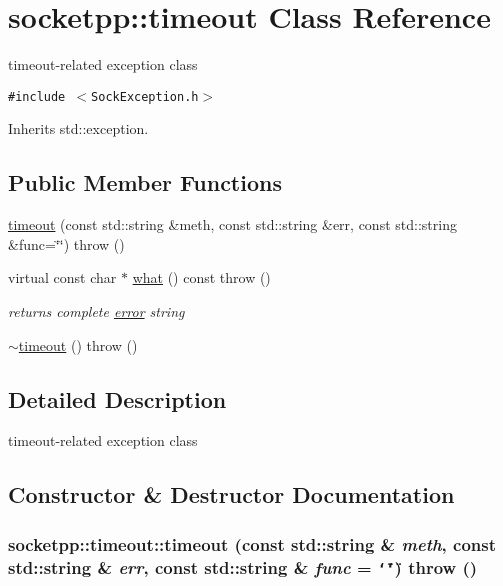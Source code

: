 \hypertarget{classsocketpp_1_1timeout}{
\section{socketpp::timeout Class Reference}
\label{classsocketpp_1_1timeout}
}
timeout-related exception class  


{\tt \#include $<$SockException.h$>$}

Inherits std::exception.

\subsection*{Public Member Functions}
\begin{CompactItemize}
\item 
\hyperlink{classsocketpp_1_1timeout_e93bd15dc9a3209c582782770b909049}{timeout} (const std::string \&meth, const std::string \&err, const std::string \&func=\char`\"{}\char`\"{})  throw ()
\item 
virtual const char $\ast$ \hyperlink{classsocketpp_1_1timeout_4ec44590b052339b206a94afbcba6ffb}{what} () const   throw ()
\begin{CompactList}\small\item\em returns complete \hyperlink{classsocketpp_1_1error}{error} string \item\end{CompactList}\item 
\hyperlink{classsocketpp_1_1timeout_8593bc6e69d1f62e41332e4b3809b3e7}{$\sim$timeout} ()  throw ()
\end{CompactItemize}


\subsection{Detailed Description}
timeout-related exception class 

\subsection{Constructor \& Destructor Documentation}
\hypertarget{classsocketpp_1_1timeout_e93bd15dc9a3209c582782770b909049}{
\subsubsection[{timeout}]{\setlength{\rightskip}{0pt plus 5cm}socketpp::timeout::timeout (const std::string \& {\em meth}, \/  const std::string \& {\em err}, \/  const std::string \& {\em func} = {\tt \char`\"{}\char`\"{}})  throw ()}}
\label{classsocketpp_1_1timeout_e93bd15dc9a3209c582782770b909049}



